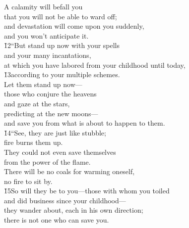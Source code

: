 \begin{poetry}
\poeml A calamity will befall you \\
\poemll    that you will not be able to ward off; \\
\poeml and devastation will come upon you suddenly, \\
\poemll    and you won't anticipate it. \\
\poeml \v{12}``But stand up now with your spells \\
\poemll    and your many incantations, \\
\poeml at which you have labored from your childhood until today, \\
\poeml \v{13}according to your multiple schemes. \\
\poeml Let them stand up now--- \\
\poemll    those who conjure the heavens \\
\poeml and gaze at the stars, \\
\poemll    predicting at the new moons--- \\
\poemlll       and save you from what is about to happen to them. \\
\poeml \v{14}``See, they are just like stubble; \\
\poemll    fire burns them up. \\
\poeml They could not even save themselves \\
\poemll    from the power of the flame. \\
\poeml There will be no coals for warming oneself, \\
\poemll    no fire to sit by. \\
\poeml \v{15}So will they be to you---those with whom you toiled \\
\poemll    and did business since your childhood--- \\
\poeml they wander about, each in his own direction; \\
\poemll    there is not one who can save you.
\end{poetry}

